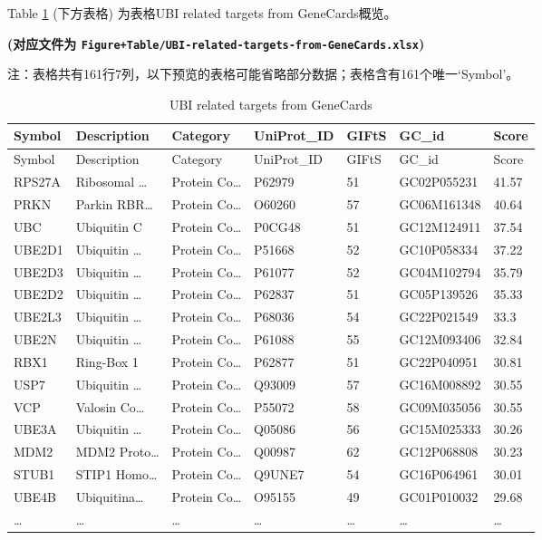 \documentclass[
]{article}
\begin{document}
Table \ref{tab:UBI-related-targets-from-GeneCards} (下方表格) 为表格UBI related targets from GeneCards概览。

\textbf{(对应文件为 \texttt{Figure+Table/UBI-related-targets-from-GeneCards.xlsx})}

\begin{center}\begin{tcolorbox}[colback=gray!10, colframe=gray!50, width=0.9\linewidth, arc=1mm, boxrule=0.5pt]注：表格共有161行7列，以下预览的表格可能省略部分数据；表格含有161个唯一`Symbol'。
\end{tcolorbox}
\end{center}

\begin{longtable}[]{@{}lllllll@{}}
\caption{\label{tab:UBI-related-targets-from-GeneCards}UBI related targets from GeneCards}\tabularnewline
\toprule
Symbol & Description & Category & UniProt\_ID & GIFtS & GC\_id & Score\tabularnewline
\midrule
\endfirsthead
\toprule
Symbol & Description & Category & UniProt\_ID & GIFtS & GC\_id & Score\tabularnewline
\midrule
\endhead
RPS27A & Ribosomal \ldots{} & Protein Co\ldots{} & P62979 & 51 & GC02P055231 & 41.57\tabularnewline
PRKN & Parkin RBR\ldots{} & Protein Co\ldots{} & O60260 & 57 & GC06M161348 & 40.64\tabularnewline
UBC & Ubiquitin C & Protein Co\ldots{} & P0CG48 & 51 & GC12M124911 & 37.54\tabularnewline
UBE2D1 & Ubiquitin \ldots{} & Protein Co\ldots{} & P51668 & 52 & GC10P058334 & 37.22\tabularnewline
UBE2D3 & Ubiquitin \ldots{} & Protein Co\ldots{} & P61077 & 52 & GC04M102794 & 35.79\tabularnewline
UBE2D2 & Ubiquitin \ldots{} & Protein Co\ldots{} & P62837 & 51 & GC05P139526 & 35.33\tabularnewline
UBE2L3 & Ubiquitin \ldots{} & Protein Co\ldots{} & P68036 & 54 & GC22P021549 & 33.3\tabularnewline
UBE2N & Ubiquitin \ldots{} & Protein Co\ldots{} & P61088 & 55 & GC12M093406 & 32.84\tabularnewline
RBX1 & Ring-Box 1 & Protein Co\ldots{} & P62877 & 51 & GC22P040951 & 30.81\tabularnewline
USP7 & Ubiquitin \ldots{} & Protein Co\ldots{} & Q93009 & 57 & GC16M008892 & 30.55\tabularnewline
VCP & Valosin Co\ldots{} & Protein Co\ldots{} & P55072 & 58 & GC09M035056 & 30.55\tabularnewline
UBE3A & Ubiquitin \ldots{} & Protein Co\ldots{} & Q05086 & 56 & GC15M025333 & 30.26\tabularnewline
MDM2 & MDM2 Proto\ldots{} & Protein Co\ldots{} & Q00987 & 62 & GC12P068808 & 30.23\tabularnewline
STUB1 & STIP1 Homo\ldots{} & Protein Co\ldots{} & Q9UNE7 & 54 & GC16P064961 & 30.01\tabularnewline
UBE4B & Ubiquitina\ldots{} & Protein Co\ldots{} & O95155 & 49 & GC01P010032 & 29.68\tabularnewline
\ldots{} & \ldots{} & \ldots{} & \ldots{} & \ldots{} & \ldots{} & \ldots{}\tabularnewline
\bottomrule
\end{longtable}
\end{document}

